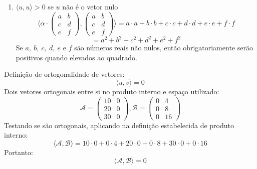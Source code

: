 \documentclass[12pt, twoside, a4]{article} %
\begin{document}
\begin{enumerate}
    \item  $\langle u, u \rangle > 0 $ se $ u $ não é o vetor nulo
    \[\langle \alpha \cdot \begin{pmatrix} 
        a & b \\
        c & d \\
        e & f
       \end{pmatrix} ,\begin{pmatrix} 
        a & b \\
        c & d \\
        e & f
       \end{pmatrix} \rangle = a \cdot a + b \cdot b + c \cdot c + d \cdot d + e \cdot e + f \cdot f\]
    \[ = a^2 + b^2 + c^2 + d^2 + e^2 + f^2 \]
    Se $ a,\ b,\ c,\ d,\ e$ e $f$ são números reais não nulos, então obrigatoriamente serão positivos quando elevados ao quadrado.
\end{enumerate}

Definição de ortogonalidade de vetores:
    \[ \langle u, v \rangle = 0\]
Dois vetores ortogonais entre si no produto interno e espaço utilizado:
\[\mathcal{A} = \begin{pmatrix} 
    10 & 0 \\
    20 & 0 \\
    30 & 0
   \end{pmatrix} ,\mathcal{B} = \begin{pmatrix} 
    0 & 4 \\
    0 & 8 \\
    0 & 16
   \end{pmatrix} \]
Testando se são ortogonais, aplicando na definição estabelecida de produto interno:
\[ \langle \mathcal{A}, \mathcal{B} \rangle = 10 \cdot 0 + 0 \cdot 4 + 20 \cdot 0 + 0 \cdot 8 + 30 \cdot 0 + 0 \cdot 16 \]
Portanto:
\[ \langle \mathcal{A}, \mathcal{B} \rangle = 0 \]
\end{document}
